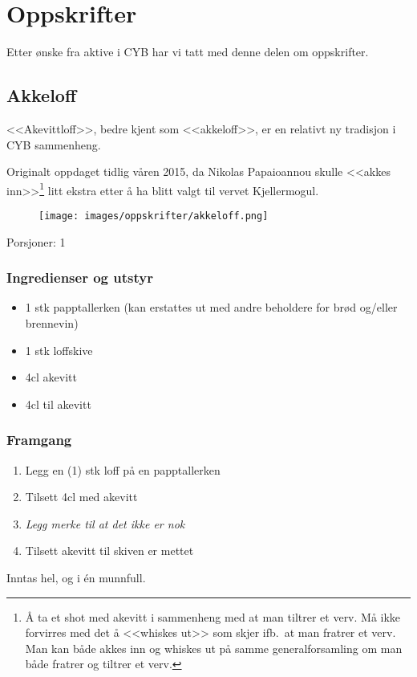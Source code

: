 \chapter*{Oppskrifter}

Etter ønske fra aktive i CYB har vi tatt med denne delen om oppskrifter.

\section*{Akkeloff}

<<Akevittloff>>, bedre kjent som <<akkeloff>>, er en relativt ny tradisjon i CYB sammenheng. 

Originalt oppdaget tidlig våren 2015, da Nikolas Papaioannou skulle <<akkes inn>>\footnote{Å ta et shot med akevitt i sammenheng med at man tiltrer et verv. Må ikke forvirres med det å <<whiskes ut>> som skjer ifb.~at man fratrer et verv. Man kan både akkes inn og whiskes ut på samme generalforsamling om man både fratrer og tiltrer et verv.} litt ekstra etter å ha blitt valgt til vervet Kjellermogul.

\begin{figure}[h!]
	\centering
	\texttt{[image: images/oppskrifter/akkeloff.png]}
\end{figure}

Porsjoner: 1

\subsection*{Ingredienser og utstyr}

\begin{itemize}
	\item 1 stk papptallerken (kan erstattes ut med andre beholdere for brød og/eller brennevin)
	\item 1 stk loffskive
	\item 4cl akevitt
	\item 4cl til akevitt
\end{itemize}

\subsection*{Framgang}

\begin{enumerate}
	\item Legg en (1) stk loff på en papptallerken
	\item Tilsett 4cl med akevitt
	\item \textit{Legg merke til at det ikke er nok}
	\item Tilsett akevitt til skiven er mettet
\end{enumerate}

Inntas hel, og i én munnfull. 